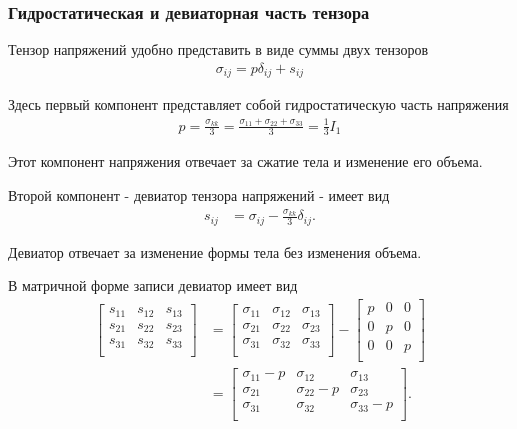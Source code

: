 \subsubsection{Гидростатическая и девиаторная часть тензора}

Тензор напряжений удобно представить в виде суммы двух тензоров
\begin{eqnarray}
\sigma_{ij}= p\delta_{ij} + s_{ij}
\end{eqnarray}

Здесь первый компонент представляет собой гидростатическую часть напряжения
\begin{eqnarray}
p=\frac{\sigma_{kk}}{3}=\frac{\sigma_{11}+\sigma_{22}+\sigma_{33}}{3}=\tfrac{1}{3}I_1
\end{eqnarray}

Этот компонент напряжения отвечает за сжатие тела и изменение его объема.

Второй компонент - девиатор тензора напряжений - имеет вид
\begin{eqnarray}
s_{ij} &= \sigma_{ij} - \frac{\sigma_{kk}}{3}\delta_{ij}.
\end{eqnarray}

Девиатор отвечает за изменение формы тела без изменения объема.

В матричной форме записи девиатор имеет вид
\begin{eqnarray}
\left[{\begin{matrix}
s_{11} & s_{12} & s_{13} \\
s_{21} & s_{22} & s_{23} \\
s_{31} & s_{32} & s_{33} \\
\end{matrix}}\right]
&=\left[{\begin{matrix}
\sigma_{11} & \sigma_{12} & \sigma_{13} \\
\sigma_{21} & \sigma_{22} & \sigma_{23} \\
\sigma_{31} & \sigma_{32} & \sigma_{33} \\
\end{matrix}}\right]-\left[{\begin{matrix}
p & 0 & 0 \\
0 & p & 0 \\
0 & 0 & p \\
\end{matrix}}\right] \\
&=\left[{\begin{matrix}
\sigma_{11}-p & \sigma_{12} & \sigma_{13} \\
\sigma_{21} & \sigma_{22}-p & \sigma_{23} \\
\sigma_{31} & \sigma_{32} & \sigma_{33}-p \\
\end{matrix}}\right]. \\
\end{eqnarray}


